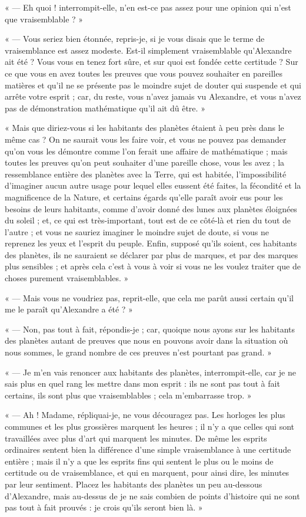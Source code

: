 \documentclass[a4paper, 11pt, oneside, landscape]{article}
\begin{document}
« --- Eh quoi ! interrompit-elle, n'en est-ce pas assez pour une opinion qui n'est que vraisemblable ? »

« --- Vous seriez bien étonnée, repris-je, si je vous disais que le terme de vraisemblance est assez modeste. Est-il simplement vraisemblable qu'Alexandre ait été ? Vous vous en tenez fort sûre, et sur quoi est fondée cette certitude ? Sur ce que vous en avez toutes les preuves que vous pouvez souhaiter en pareilles matières et qu'il ne se présente pas le moindre sujet de douter qui suspende et qui arrête votre esprit ; car, du reste, vous n'avez jamais vu Alexandre, et vous n'avez pas de démonstration mathématique qu'il ait dû être. »

« Mais que diriez-vous si les habitants des planètes étaient à peu près dans le même cas ? On ne saurait vous les faire voir, et vous ne pouvez pas demander qu'on vous les démontre comme l'on ferait une affaire de mathématique ; mais toutes les preuves qu'on peut souhaiter d'une pareille chose, vous les avez ; la ressemblance entière des planètes avec la Terre, qui est habitée, l'impossibilité d'imaginer aucun autre usage pour lequel elles eussent été faites, la fécondité et la magnificence de la Nature, et certains égards qu'elle paraît avoir eus pour les besoins de leurs habitants, comme d'avoir donné des lunes aux planètes éloignées du soleil ; et, ce qui est très-important, tout est de ce côté-là et rien du tout de l'autre ; et vous ne sauriez imaginer le moindre sujet de doute, si vous ne reprenez les yeux et l'esprit du peuple. Enfin, supposé qu'ils soient, ces habitants des planètes, ils ne sauraient se déclarer par plus de marques, et par des marques plus sensibles ; et après cela c'est à vous à voir si vous ne les voulez traiter que de choses purement vraisemblables. »

« --- Mais vous ne voudriez pas, reprit-elle, que cela me parût aussi certain qu'il me le paraît qu'Alexandre a été ? »

« --- Non, pas tout à fait, répondis-je ; car, quoique nous ayons sur les habitants des planètes autant de preuves que nous en pouvons avoir dans la situation où nous sommes, le grand nombre de ces preuves n'est pourtant pas grand. »

« --- Je m'en vais renoncer aux habitants des planètes, interrompit-elle, car je ne sais plus en quel rang les mettre dans mon esprit : ils ne sont pas tout à fait certains, ils sont plus que vraisemblables ; cela m'embarrasse trop. »

« --- Ah ! Madame, répliquai-je, ne vous découragez pas. Les horloges les plus communes et les plus grossières marquent les heures ; il n'y a que celles qui sont travaillées avec plus d'art qui marquent les minutes. De même les esprits ordinaires sentent bien la différence d'une simple vraisemblance à une certitude entière ; mais il n'y a que les esprits fins qui sentent le plus ou le moins de certitude ou de vraisemblance, et qui en marquent, pour ainsi dire, les minutes par leur sentiment. Placez les habitants des planètes un peu au-dessous d'Alexandre, mais au-dessus de je ne sais combien de points d'histoire qui ne sont pas tout à fait prouvés : je crois qu'ils seront bien là. »
\end{document}
